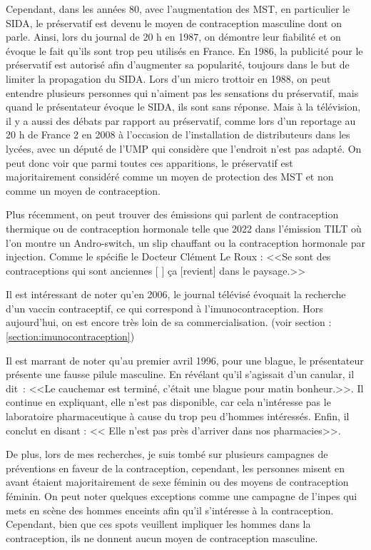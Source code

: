 \documentclass[12pt,a4paper]{report}
\begin{document}
Cependant, dans les années 80, avec l'augmentation des MST, en particulier le SIDA, le préservatif est devenu le moyen de contraception masculine dont on parle. Ainsi, lors du journal de 20 h en 1987, on démontre leur fiabilité et on évoque le fait qu'ils sont trop peu utilisés en France. \cite{EssaisPreservatifsINA} En 1986, la publicité pour le préservatif est autorisé afin d'augmenter sa popularité, toujours dans le but de limiter la propagation du SIDA. \cite{PublicitePreservatifsSida} Lors d'un micro trottoir en 1988, on peut entendre plusieurs personnes qui n'aiment pas les sensations du préservatif, mais quand le présentateur évoque le SIDA, ils sont sans réponse. \cite{DebatPreservatifsDans}
Mais à la télévision, il y a aussi des débats par rapport au préservatif, comme lors d'un reportage au 20 h de France 2 en 2008 à l'occasion de l'installation de distributeurs dans les lycées, avec un député de l'UMP qui considère que l'endroit n'est pas adapté. \cite{DebatPreservatifsDans} On peut donc voir que parmi toutes ces apparitions, le préservatif est majoritairement considéré comme un moyen de protection des MST et non comme un moyen de contraception.

Plus récemment, on peut trouver des émissions qui parlent de contraception thermique ou de contraception hormonale telle que 2022 dans l'émission TILT où l'on montre un Andro-switch, un slip chauffant ou la contraception hormonale par injection. Comme le spécifie le Docteur Clément Le Roux : <<Se sont des contraceptions qui sont anciennes [ ] ça [revient] dans le paysage.>>\cite{tvtours-valdeloireContraceptionMasculineConnaissezvous22}

Il est intéressant de noter qu'en 2006, le journal télévisé évoquait la recherche d'un vaccin contraceptif, ce qui correspond à l'imunocontraception. Hors aujourd'hui, on est encore très loin de sa commercialisation. (voir section : \ref{section:imunocontraception}) \cite{ContraceptionMasculinePilule}

Il est marrant de noter qu'au premier avril 1996, pour une blague, le présentateur présente une fausse pilule masculine. En révélant qu'il s'agissait d'un canular, il dit : <<Le cauchemar est terminé, c'était une blague pour matin bonheur.>>. Il continue en expliquant, elle n'est pas disponible, car cela n'intéresse pas le laboratoire pharmaceutique à cause du trop peu d'hommes intéressés. Enfin, il conclut en disant : << Elle n'est pas près d'arriver dans nos pharmacies>>. \cite{PremierePilulePour}

De plus, lors de mes recherches, je suis tombé sur plusieurs campagnes de préventions en faveur de la contraception, cependant, les personnes misent en avant étaient majoritairement de sexe féminin ou des moyens de contraception féminin. \cites{inapolitiqueCampagneContraception2012}{ContraceptionReunionINA}{ContraceptionJeuneFille}{ContraceptionJeuneFemme}{ContraceptionCoupleINA}{ContraceptionDefileINA}{mccannparisINPESContraception2011} On peut noter quelques exceptions comme une campagne de l'inpes qui mets en scène des hommes enceints afin qu'il s'intéresse à la contraception. Cependant, bien que ces spots veuillent impliquer les hommes dans la contraception, ils ne donnent aucun moyen de contraception masculine. \cite{HommesMisEnceintes2010}
\end{document}
